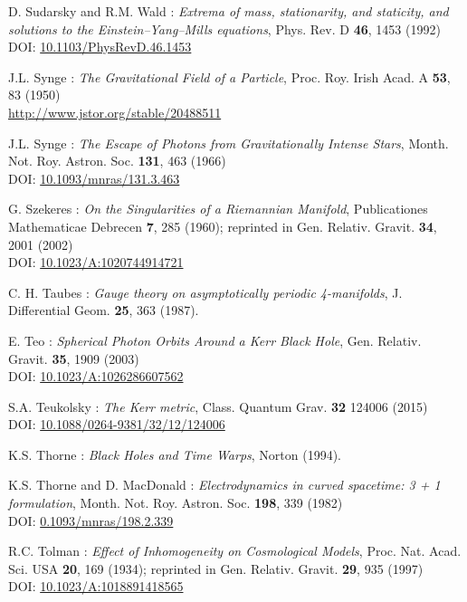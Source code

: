 \begin{thebibliography}{123}
D. Sudarsky and R.M. Wald : {\em Extrema of mass, stationarity, and staticity,
and solutions to the Einstein–Yang–Mills equations},
Phys. Rev. D {\bf 46}, 1453 (1992)\\
DOI: \href{https://doi.org/10.1103/PhysRevD.46.1453}{10.1103/PhysRevD.46.1453}

J.L. Synge : {\em The Gravitational Field of a Particle},
Proc. Roy. Irish Acad. A {\bf 53}, 83 (1950)\\
\url{http://www.jstor.org/stable/20488511}

J.L. Synge : {\em The Escape of Photons from Gravitationally Intense Stars},
Month. Not. Roy. Astron. Soc. {\bf 131}, 463 (1966)\\
DOI: \href{https://doi.org/10.1093/mnras/131.3.463}{10.1093/mnras/131.3.463}

G. Szekeres : {\em On the Singularities of a Riemannian Manifold},
Publicationes Mathematicae Debrecen {\bf 7}, 285 (1960); reprinted in
Gen. Relativ. Gravit. {\bf 34}, 2001 (2002)\\
DOI: \href{https://doi.org/10.1023/A:1020744914721}{10.1023/A:1020744914721}

C. H. Taubes : {\em Gauge theory on asymptotically periodic 4-manifolds},
J. Differential Geom. {\bf 25}, 363 (1987).

E. Teo : {\em Spherical Photon Orbits Around a Kerr Black Hole},
Gen. Relativ. Gravit. {\bf 35}, 1909 (2003)\\
DOI: \href{https://doi.org/10.1023/A:1026286607562}{10.1023/A:1026286607562}

S.A. Teukolsky : {\em The Kerr metric},
Class. Quantum Grav. {\bf 32} 124006 (2015)\\
DOI: \href{https://doi.org/10.1088/0264-9381/32/12/124006}{10.1088/0264-9381/32/12/124006}

K.S. Thorne : {\em Black Holes and Time Warps}, Norton (1994).

K.S. Thorne and D. MacDonald : {\em Electrodynamics in curved spacetime: 3 + 1 formulation},
Month. Not. Roy. Astron. Soc. {\bf 198}, 339 (1982)\\
DOI: \href{https://doi.org/10.1093/mnras/198.2.339}{0.1093/mnras/198.2.339}

R.C. Tolman :
{\em Effect of Inhomogeneity on Cosmological Models},
Proc. Nat. Acad. Sci. USA {\bf 20}, 169 (1934);
reprinted in Gen. Relativ. Gravit. {\bf 29}, 935 (1997)\\
DOI: \href{https://doi.org/10.1023/A:1018891418565}{10.1023/A:1018891418565}


\end{thebibliography}
